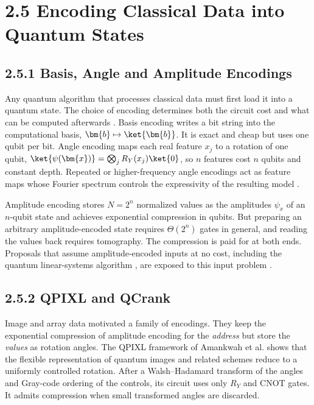 \documentclass{report}
\theoremstyle{plain}
\theoremstyle{definition}
\theoremstyle{remark}
\begin{document}
\section{2.5 Encoding Classical Data into Quantum States}\label{sec:bg:encoding}

\subsection{2.5.1 Basis, Angle and Amplitude Encodings}

Any quantum algorithm that processes classical data must first load it into a quantum state. The choice of encoding determines both the circuit cost and what can be computed afterwards \cite{schuld2021dataencoding,larose2020encodings}. Basis encoding writes a bit string into the computational basis, $\bm{b}\mapsto\ket{\bm{b}}$. It is exact and cheap but uses one qubit per bit. Angle encoding maps each real feature $x_j$ to a rotation of one qubit, $\ket{\psi(\bm{x})}=\bigotimes_j R_Y(x_j)\ket{0}$, so $n$ features cost $n$ qubits and constant depth. Repeated or higher-frequency angle encodings act as feature maps whose Fourier spectrum controls the expressivity of the resulting model \cite{schuld2021dataencoding,havlicek2019featurespaces}.

Amplitude encoding stores $N=2^n$ normalized values as the amplitudes $\psi_x$ of an $n$-qubit state and achieves exponential compression in qubits. But preparing an arbitrary amplitude-encoded state requires $\Theta(2^n)$ gates in general, and reading the values back requires tomography. The compression is paid for at both ends. Proposals that assume amplitude-encoded inputs at no cost, including the quantum linear-systems algorithm \cite{harrow2009hhl}, are exposed to this input problem \cite{biamonte2017qml}.

\subsection{2.5.2 QPIXL and QCrank}

Image and array data motivated a family of encodings. They keep the exponential compression of amplitude encoding for the \emph{address} but store the \emph{values} as rotation angles. The QPIXL framework of Amankwah et al. \cite{amankwah2022qpixl} shows that the flexible representation of quantum images and related schemes reduce to a uniformly controlled rotation. After a Walsh--Hadamard transform of the angles and Gray-code ordering of the controls, its circuit uses only $R_Y$ and CNOT gates. It admits compression when small transformed angles are discarded.
\end{document}
